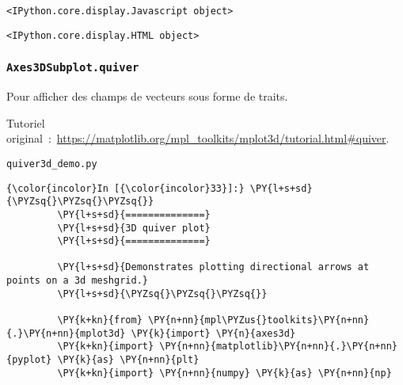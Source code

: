     
    \begin{verbatim}
<IPython.core.display.Javascript object>
    \end{verbatim}

    
    
    \begin{verbatim}
<IPython.core.display.HTML object>
    \end{verbatim}

    
    \hypertarget{axes3dsubplot.quiver}{%
\subsubsection{\texorpdfstring{\texttt{Axes3DSubplot.quiver}}{Axes3DSubplot.quiver}}\label{axes3dsubplot.quiver}}

    Pour afficher des champs de vecteurs sous forme de traits.

    Tutoriel
original~:~\url{https://matplotlib.org/mpl_toolkits/mplot3d/tutorial.html\#quiver}.

    \texttt{quiver3d\_demo.py}

    \begin{Verbatim}[commandchars=\\\{\},frame=single,framerule=0.3mm,rulecolor=\color{cellframecolor}]
{\color{incolor}In [{\color{incolor}33}]:} \PY{l+s+sd}{\PYZsq{}\PYZsq{}\PYZsq{}}
         \PY{l+s+sd}{==============}
         \PY{l+s+sd}{3D quiver plot}
         \PY{l+s+sd}{==============}
         
         \PY{l+s+sd}{Demonstrates plotting directional arrows at points on a 3d meshgrid.}
         \PY{l+s+sd}{\PYZsq{}\PYZsq{}\PYZsq{}}
         
         \PY{k+kn}{from} \PY{n+nn}{mpl\PYZus{}toolkits}\PY{n+nn}{.}\PY{n+nn}{mplot3d} \PY{k}{import} \PY{n}{axes3d}
         \PY{k+kn}{import} \PY{n+nn}{matplotlib}\PY{n+nn}{.}\PY{n+nn}{pyplot} \PY{k}{as} \PY{n+nn}{plt}
         \PY{k+kn}{import} \PY{n+nn}{numpy} \PY{k}{as} \PY{n+nn}{np}
\end{Verbatim}


